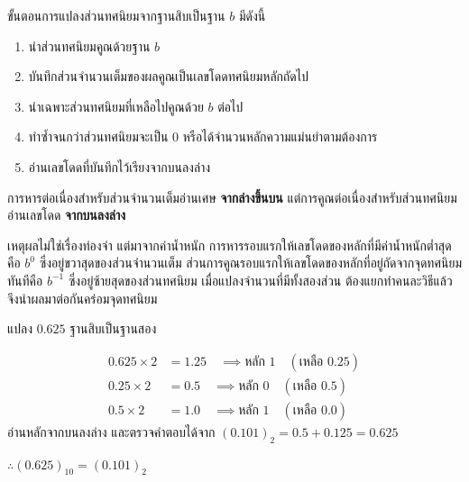 \begin{principle}
\label{principle:fractional-conversion-steps}
ขั้นตอนการแปลงส่วนทศนิยมจากฐานสิบเป็นฐาน $b$ มีดังนี้
\begin{enumerate}
    \item นำส่วนทศนิยมคูณด้วยฐาน $b$
    \item บันทึกส่วนจำนวนเต็มของผลคูณเป็นเลขโดดทศนิยมหลักถัดไป
    \item นำเฉพาะส่วนทศนิยมที่เหลือไปคูณด้วย $b$ ต่อไป
    \item ทำซ้ำจนกว่าส่วนทศนิยมจะเป็น 0 หรือได้จำนวนหลักความแม่นยำตามต้องการ
    \item อ่านเลขโดดที่บันทึกไว้เรียงจากบนลงล่าง
\end{enumerate}
\end{principle}

\begin{warning}
การหารต่อเนื่องสำหรับส่วนจำนวนเต็มอ่านเศษ \textbf{จากล่างขึ้นบน} แต่การคูณต่อเนื่องสำหรับส่วนทศนิยมอ่านเลขโดด \textbf{จากบนลงล่าง}

เหตุผลไม่ใช่เรื่องท่องจำ แต่มาจากค่าน้ำหนัก การหารรอบแรกให้เลขโดดของหลักที่มีค่าน้ำหนักต่ำสุดคือ $b^0$ ซึ่งอยู่ขวาสุดของส่วนจำนวนเต็ม ส่วนการคูณรอบแรกให้เลขโดดของหลักที่อยู่ถัดจากจุดทศนิยมทันทีคือ $b^{-1}$ ซึ่งอยู่ซ้ายสุดของส่วนทศนิยม เมื่อแปลงจำนวนที่มีทั้งสองส่วน ต้องแยกทำคนละวิธีแล้วจึงนำผลมาต่อกันคร่อมจุดทศนิยม
\end{warning}

\begin{ex}
\label{ex:frac-terminating}
แปลง $0.625$ ฐานสิบเป็นฐานสอง
\end{ex}
\begin{solution}
\begin{align*}
0.625 \times 2 &= 1.25 \quad \implies \text{หลัก } 1 \quad (\text{เหลือ } 0.25)\\
0.25  \times 2 &= 0.5  \quad \implies \text{หลัก } 0 \quad (\text{เหลือ } 0.5)\\
0.5   \times 2 &= 1.0  \quad \implies \text{หลัก } 1 \quad (\text{เหลือ } 0.0)
\end{align*}
อ่านหลักจากบนลงล่าง และตรวจคำตอบได้จาก $(0.101)_2 = 0.5 + 0.125 = 0.625$

$\therefore (0.625)_{10} = (0.101)_2$ \solhere
\end{solution}

